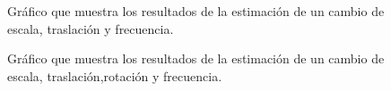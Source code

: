 \begin{figure}[H]
\begin{center}
\hspace{0.5cm}

\end{center}

\caption{Gráfico que muestra los resultados de la estimación de un cambio de escala, traslación y frecuencia.}
\end{figure}


\begin{figure}[H]
\begin{center}
\hspace{0.5cm}

\end{center}

\caption{Gráfico que muestra los resultados de la estimación de un cambio de escala, traslación,rotación y frecuencia.}
\end{figure}


